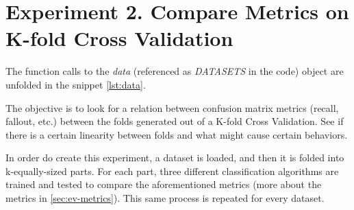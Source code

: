 \section{Experiment 2. Compare Metrics on K-fold Cross Validation}
\label{sec:exp-kfold-code}

The function calls to the \textit{data} (referenced as \textit{DATASETS} in the 
code) object are unfolded in the snippet \ref{lst:data}.

The objective is to look for a relation between confusion matrix metrics 
(recall, fallout, etc.) between the folds generated out of a K-fold Cross
Validation. See if there is a certain linearity between folds and what might 
cause certain behaviors.

In order do create this experiment, a dataset is loaded, and then it is folded 
into k-equally-sized parts. For each part, three different classification 
algorithms are trained and tested to compare the aforementioned metrics
(more about the metrics in \ref{sec:ev-metrics}). This same process is repeated
for every dataset.

